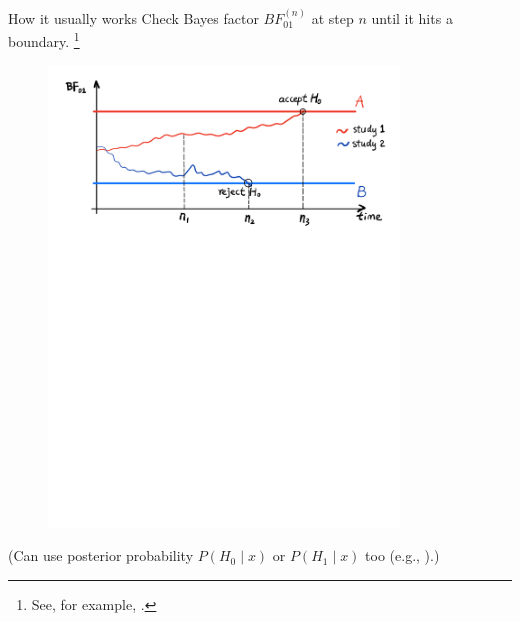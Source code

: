 \documentclass[11pt
,fragile=singleslide
,xcolor=dvipsnames
]{beamer}
\begin{document}
\begin{frame}{How it usually works}
	Check Bayes factor $BF_{01}^{(n)}$ at step $n$ until it hits a boundary. \footnote{See, for example, \cite{barnard1946sequential,wetherill1961bayesian,berger1994unified,berger1988likelihood,berger1997unified,berger1999simultaneous}.}

\begin{figure}
	\includegraphics[width=0.83\textwidth, trim=0 7.3in 0 0.3in, clip]{figures/Bayes_Factor_Sequential_Testing.pdf}
\end{figure}
	
	\pause
	\vspace{0.15in}
	\footnotesize{
	(Can use posterior probability $P(H_0 \mid x)$ or $P(H_1 \mid x)$ too (e.g., \cite{cornfield1966bayesian}).)
}
	
\end{frame}
\end{document}
